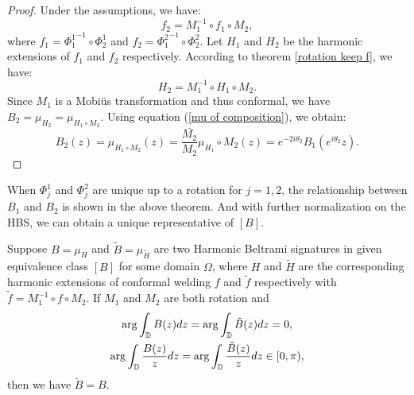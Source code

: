 \documentclass[review,onefignum,onetabnum]{siamonline190516}
\begin{document}
    \begin{proof}
        Under the assumptions, we have: 
        \[
        f_2 = M_1^{-1}\circ f_1 \circ M_2,
        \]
        \noindent where $f_1 = {\Phi_1^1}^{-1}\circ \Phi_2^1$ and $f_2 = {\Phi_1^2}^{-1}\circ \Phi_2^2$. Let $H_1$ and $H_2$ be the harmonic extensions of $f_1$ and $f_2$ respectively. According to theorem \ref{rotation keep f}, we have:
        \[
        H_2 = M_1^{-1}\circ H_1 \circ M_2.
        \]
        Since $M_1$ is a Mobi\"us transformation and thus conformal, we have $B_2 = \mu_{H_2} = \mu_{H_1\circ M_2}$. Using equation (\ref{mu of composition}), we obtain:
        \begin{equation*}
        B_2(z) = \mu_{H_1\circ M_2}(z) = \frac{\bar{M_2}}{M_2} \mu_{H_1}\circ M_2(z) = e^{-2i\theta_2} B_1( e^{i\theta_2} z).
        \end{equation*}
    \end{proof}
    
    When $\Phi_j^1$ and $\Phi_j^2$ are unique up to a rotation for $j=1, 2$, the relationship between $B_1$ and $B_2$ is shown in the above theorem. And with further normalization on the HBS, we can obtain a unique representative of $[B]$.

    \begin{theorem}\label{unique B}
        Suppose $B = \mu_H$ and $\tilde{B} = \mu_{\tilde{H}}$ are two Harmonic Beltrami signatures in given equivalence class $[B]$ for some domain $\Omega$, where $H$ and $\tilde{H}$ are the corresponding harmonic extensions of conformal welding $f$ and $\tilde{f}$ respectively with $\tilde{f} = M_1^{-1} \circ f \circ M_2$. If $M_1$ and $M_2$ are both rotation and
        \begin{gather}
                \arg \int_\D B(z) dz = \arg \int_\D \tilde{B}(z)dz = 0,\label{arg integral B is 0}\\
                \arg \int_\D \frac{B(z)}{z} dz = \arg \int_\D \frac{\tilde{B}(z)}{z}dz \in [0, \pi),\label{arg in 0 and pi}
        \end{gather}
        then we have $\tilde{B} = B$.
    \end{theorem}
\end{document}
